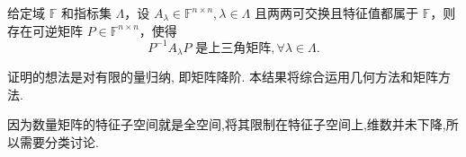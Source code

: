 \documentclass[../../main.tex]{subfiles}%
\begin{document}
\begin{proposition}[一族两两可交换的一般域上的矩阵可同时上三角化]\label{proposition:一族两两可交换的一般域上的矩阵可同时上三角化}
给定域 $\mathbb{F}$ 和指标集 $\Lambda$，设 $A_\lambda \in \mathbb{F}^{n \times n}, \lambda \in \Lambda$ 且两两可交换且特征值都属于 $\mathbb{F}$，则存在可逆矩阵 $P \in \mathbb{F}^{n \times n}$，使得
\[P^{-1}A_\lambda P \text{ 是上三角矩阵}, \forall \lambda \in \Lambda.\]
\end{proposition}
\begin{note}
证明的想法是对有限的量归纳, 即矩阵降阶. 本结果将综合运用几何方法和矩阵方法.
\end{note}
\begin{remark}
因为数量矩阵的特征子空间就是全空间,将其限制在特征子空间上,维数并未下降,所以需要分类讨论.
\end{remark}
\end{document}
